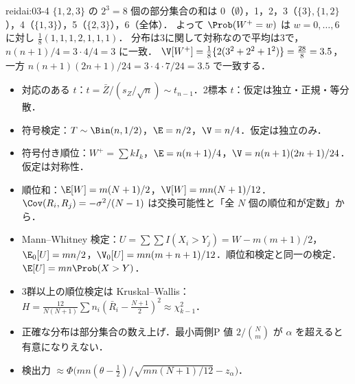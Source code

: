 \begin{kaitou}{reidai:03-4}
$\{1,2,3\}$ の $2^3=8$ 個の部分集合の和は
0（$\emptyset$），1，2，3（$\{3\},\{1,2\}$），4（$\{1,3\}$），5（$\{2,3\}$），6（全体）．
よって $\Prob(W^+=w)$ は $w=0,\dots,6$ に対し $\frac18(1,1,1,2,1,1,1)$．
分布は3に関して対称なので平均は3で，$n(n+1)/4=3\cdot4/4=3$ に一致．
$\V[W^+]=\frac18\{2(3^2+2^2+1^2)\}=\frac{28}{8}=3.5$，
一方 $n(n+1)(2n+1)/24=3\cdot4\cdot7/24=3.5$ で一致する．
\end{kaitou}

\enlargethispage{3\baselineskip}
\begin{summarybox}
\begin{itemize}
\item 対応のある $t$：$t=\bar Z/(s_Z/\sqrt n)\sim t_{n-1}$．2標本 $t$：仮定は独立・正規・等分散．
\item 符号検定：$T\sim\Bin(n,1/2)$，$\E=n/2$，$\V=n/4$．仮定は独立のみ．
\item 符号付き順位：$W^+=\sum kI_k$，$\E=n(n+1)/4$，$\V=n(n+1)(2n+1)/24$．仮定は対称性．
\item 順位和：$\E[W]=m(N+1)/2$，$\V[W]=mn(N+1)/12$．$\Cov(R_i,R_j)=-\sigma^2/(N-1)$ は交換可能性と「全 $N$ 個の順位和が定数」から．
\item Mann--Whitney 検定：$U=\sum\sum I(X_i>Y_j)=W-m(m+1)/2$，$\E_0[U]=mn/2$，$\V_0[U]=mn(m+n+1)/12$．順位和検定と同一の検定．$\E[U]=mn\Prob(X>Y)$．
\item 3群以上の順位検定は Kruskal--Wallis：$H=\frac{12}{N(N+1)}\sum n_i(\bar R_i-\frac{N+1}2)^2\approx\chi^2_{k-1}$．
\item 正確な分布は部分集合の数え上げ．最小両側P 値 $2/\binom Nm$ が $\alpha$ を超えると有意になりえない．
\item 検出力 $\approx\Phi\bigl(mn(\theta-\frac12)/\sqrt{mn(N+1)/12}-z_\alpha\bigr)$．
\end{itemize}
\end{summarybox}
